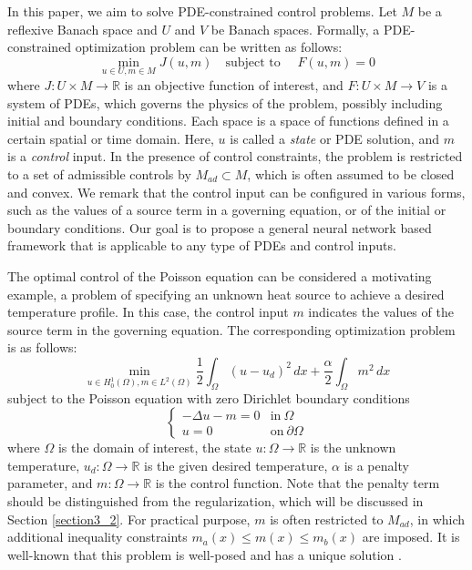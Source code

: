 \documentclass[letterpaper]{article}
\begin{document}
In this paper, we aim to solve PDE-constrained control problems. Let $M$ be a reflexive Banach space and $U$ and $V$ be Banach spaces. Formally, a PDE-constrained optimization problem can be written as follows:
\begin{equation}
    \min_{u \in U, m \in M} J(u, m) \quad \text{subject to } \quad F(u, m) = 0    
\end{equation}
where $J: U \times M \rightarrow \mathbb{R}$ is an objective function of interest, and $F: U \times M \rightarrow V$ is a system of PDEs, which governs the physics of the problem, possibly including initial and boundary conditions. Each space is a space of functions defined in a certain spatial or time domain. Here, $u$ is called a \textit{state} or PDE solution, and $m$ is a \textit{control} input. In the presence of control constraints, the problem is restricted to a set of admissible controls by $M_{ad} \subset M$, which is often assumed to be closed and convex. We remark that the control input can be configured in various forms, such as the values of a source term in a governing equation, or of the initial or boundary conditions. Our goal is to propose a general neural network based framework that is applicable to any type of PDEs and control inputs.

The optimal control of the Poisson equation can be considered a motivating example, a problem of specifying an unknown heat source to achieve a desired temperature profile. In this case, the control input $m$ indicates the values of the source term in the governing equation. The corresponding optimization problem is as follows:
\begin{equation}\label{poisson_control_objective}
  \min_{u \in H_0^1(\Omega), m \in L^2(\Omega)} \frac{1}{2}\int_{\Omega} (u-u_d)^2 \, dx  + \frac{\alpha}{2} \int_\Omega m^2 \, dx
\end{equation}
subject to the Poisson equation with zero Dirichlet boundary conditions
\begin{equation}\label{poisson_equation}
    \begin{cases}
    - \Delta u - m = 0 &\text{in}\ \Omega \\
    u = 0 &\text{on}\ \partial \Omega 
  \end{cases}    
\end{equation}
where $\Omega$ is the domain of interest, the state $u: \Omega \rightarrow \mathbb{R}$ is the unknown temperature, $u_d: \Omega \rightarrow \mathbb{R}$ is the given desired temperature, $\alpha$ is a penalty parameter, and $m: \Omega \rightarrow \mathbb{R}$ is the control function. Note that the penalty term should be distinguished from the regularization, which will be discussed in Section \ref{section3_2}. For practical purpose, $m$ is often restricted to $M_{ad}$, in which additional inequality constraints $m_a(x) \leq m(x) \leq m_b(x)$ are imposed. It is well-known that this problem is well-posed and has a unique solution \cite{hinze2008optimization, troltzsch2010optimal}.
\end{document}
